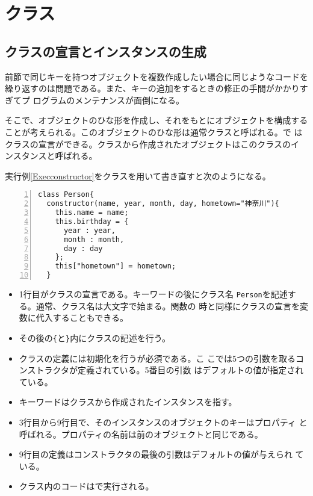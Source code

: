 \section{クラス}
\subsection{クラスの宣言とインスタンスの生成}
前節で同じキーを持つオブジェクトを複数作成したい場合に同じようなコードを
繰り返すのは問題である。また、キーの追加をするときの修正の手間がかかりすぎてプ
ログラムのメンテナンスが面倒になる。

そこで、オブジェクトのひな形を作成し、それをもとにオブジェクトを構成する
ことが考えられる。このオブジェクトのひな形は通常クラスと呼ばれる。\ES で
はクラスの宣言ができる。クラスから作成されたオブジェクトはこのクラスのイ
ンスタンスと呼ばれる。
\begin{Exec}\upshape\label{ExecconstructorClass}
実行例\ref{Execconstructor}をクラスを用いて書き直すと次のようになる。
\begin{Verbatim}[numbers=left]
class Person{
  constructor(name, year, month, day, hometown="神奈川"){
    this.name = name;
    this.birthday = {
      year : year,
      month : month,
      day : day
    };
    this["hometown"] = hometown;
  }
\end{Verbatim}
\begin{itemize}
 \item 1行目がクラスの宣言である。キーワードの後にクラス名
       \texttt{Person}を記述する。通常、クラス名は大文字で始まる。関数の
       時と同様にクラスの宣言を変数に代入することもできる。
 \item その後の\Verb+{+と\Verb+}+内にクラスの記述を行う。
 \item クラスの定義には初期化を行うが必須である。こ
       こでは5つの引数を取るコンストラクタが定義されている。5番目の引数
       はデフォルトの値が指定されている。
 \item キーワードはクラスから作成されたインスタンスを指す。
 \item 3行目から9行目で、そのインスタンスのオブジェクトのキーはプロパティ
			 と呼ばれる。プロパティの名前は前のオブジェクトと同じである。
 \item 9行目の定義はコンストラクタの最後の引数はデフォルトの値が与えられ
			 ている。
 \item クラス内のコードは\Strict で実行される。
\end{itemize}

\end{Exec}
